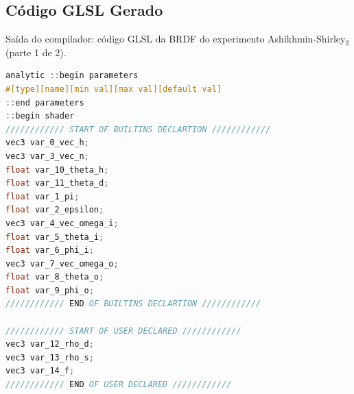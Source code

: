 \subsection{Código GLSL Gerado}
\begin{codigo}[H]
    \caption{\small Saída do compilador: código GLSL da BRDF do experimento Ashikhmin-Shirley$_2$ (parte 1 de 2).}
    \label{cod-ashikhmin-shirley-alternative-glsl-pt-1}
\begin{lstlisting}[language=C, inputencoding=utf8]
analytic ::begin parameters
#[type][name][min val][max val][default val]
::end parameters
::begin shader
//////////// START OF BUILTINS DECLARTION ////////////
vec3 var_0_vec_h;
vec3 var_3_vec_n;
float var_10_theta_h;
float var_11_theta_d;
float var_1_pi;
float var_2_epsilon;
vec3 var_4_vec_omega_i;
float var_5_theta_i;
float var_6_phi_i;
vec3 var_7_vec_omega_o;
float var_8_theta_o;
float var_9_phi_o;
//////////// END OF BUILTINS DECLARTION ////////////

//////////// START OF USER DECLARED ////////////
vec3 var_12_rho_d;
vec3 var_13_rho_s;
vec3 var_14_f;
//////////// END OF USER DECLARED ////////////
\end{lstlisting}
\end{codigo}

